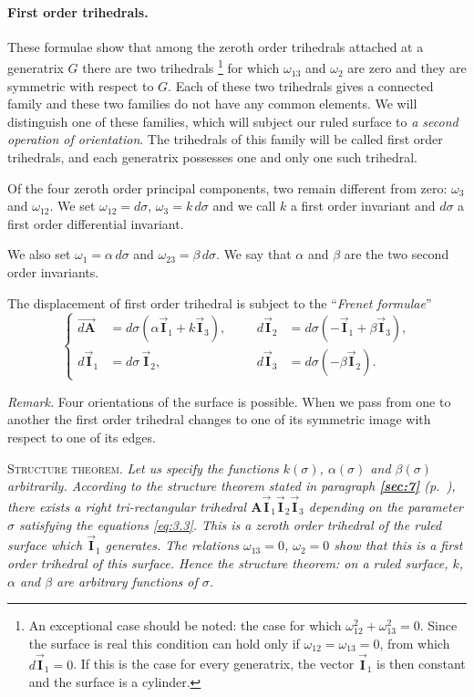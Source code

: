 \documentclass[leqno,11pt]{book}
\numberwithin{equation}{chapter}
\theoremstyle{shape1}
\theoremstyle{shapesmall}
\newcommand{\fsref}[1]{{\rm\textsection\textbf{\ref{sec:#1}}}}
\newcommand{\rvec}[1]{\vec{\mathbf{#1}}}
\newcommand{\ivec}{\rvec{I}}
\newcommand{\somespace}{\vspace{9pt}}
\begin{document}
\paragraph{First order trihedrals.}
\label{sec:45}
These formulae show that among the zeroth order trihedrals attached at a generatrix $G$ there are two trihedrals \footnote{An exceptional case should be noted: the case for which $\omega_{12}^{2}+\omega_{13}^{2}=0$. Since the surface is real this condition can hold only if $\omega_{12}=\omega_{13}=0$, from which $d\ivec_{1}=0$. If this is the case for every generatrix, the vector $\ivec_{1}$ is then constant and the surface is a cylinder.} for which $\omega_{13}$ and $\omega_{2}$ are zero and they are symmetric with respect to $G$. Each of these two trihedrals gives a connected family and these two families do not have any common elements. We will distinguish one of these families, which will subject our ruled surface to \emph{a second operation of orientation}. The trihedrals of this family will be called first order trihedrals, and each generatrix possesses one and only one such trihedral.

Of the four zeroth order principal components, two remain different from zero: $\omega_{3}$ and $\omega_{12}$. We set $\omega_{12}=d\sigma$, $\omega_{3}=k\,d\sigma$ and we call $k$ a first order invariant and $d\sigma$ a first order differential invariant.

We also set $\omega_{1}=\alpha\,d\sigma$ and $\omega_{23}=\beta\,d\sigma$. We say that $\alpha$ and $\beta$ are the two second order invariants.

The displacement of first order trihedral is subject to the ``\emph{Frenet formulae}''
\begin{equation}
  \label{eq:3.3}
  \left\{
    \begin{aligned}
      \overrightarrow{d\mathbf{A}}&=d\sigma(\alpha\ivec_{1}+k\ivec_{3}),&&&d\ivec_{2}&=d\sigma(-\ivec_{1}+\beta\ivec_{3}),\\
      d\ivec_{1}&=d\sigma\,\ivec_{2},&&&d\ivec_{3}&=d\sigma(-\beta\ivec_{2}).
    \end{aligned}
  \right.
\end{equation}

\emph{Remark.} Four orientations of the surface is possible. When we pass from one to another the first order trihedral changes to one of its symmetric image with respect to one of its edges.

\somespace

\textsc{Structure theorem.} \emph{Let us specify the functions $k(\sigma)$, $\alpha(\sigma)$ and $\beta(\sigma)$ arbitrarily. According to the structure theorem stated in paragraph \emph{\fsref{7} (p.~\pageref{sec:7})}, there exists a right tri-rectangular trihedral $\textbf{A}\ivec_1\ivec_2\ivec_3$ depending on the parameter $\sigma$ satisfying the equations \eqref{eq:3.3}. This is a zeroth order trihedral of the ruled surface which $\ivec_{1}$ generates. The relations $\omega_{13}=0$, $\omega_{2}=0$ show that this is a first order trihedral of this surface. Hence the structure theorem: on a ruled surface, $k$, $\alpha$ and $\beta$ are arbitrary functions of $\sigma$.}
\end{document}
